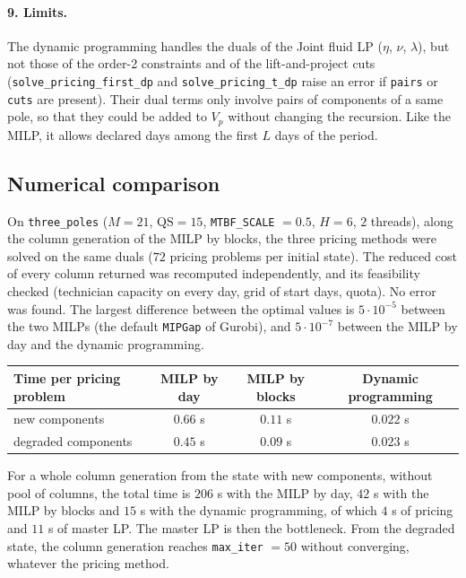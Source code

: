 \documentclass[11pt]{article}
\begin{document}
\paragraph{9. Limits.} The dynamic programming handles the duals of the Joint fluid LP ($\eta$,
$\nu$, $\lambda$), but not those of the order-2 constraints and of the lift-and-project cuts
(\texttt{solve\_pricing\_first\_dp} and \texttt{solve\_pricing\_t\_dp} raise an error if
\texttt{pairs} or \texttt{cuts} are present). Their dual terms only involve pairs of components of a
same pole, so that they could be added to $V_p$ without changing the recursion. Like the MILP, it
allows declared days among the first $L$ days of the period.

\subsection*{Numerical comparison}

On \texttt{three\_poles} ($M = 21$, $\mathrm{QS} = 15$, \texttt{MTBF\_SCALE} $= 0.5$, $H = 6$, $2$
threads), along the column generation of the MILP by blocks, the three pricing methods were solved
on the same duals ($72$ pricing problems per initial state). The reduced cost of every column
returned was recomputed independently, and its feasibility checked (technician capacity on every
day, grid of start days, quota). No error was found. The largest difference between the optimal
values is $5 \cdot 10^{-5}$ between the two MILPs (the default \texttt{MIPGap} of Gurobi), and
$5 \cdot 10^{-7}$ between the MILP by day and the dynamic programming.
\begin{center}
\begin{tabular}{lccc}
  \toprule
  Time per pricing problem & MILP by day & MILP by blocks & Dynamic programming \\
  \midrule
  new components & $0.66$ s & $0.11$ s & $0.022$ s \\
  degraded components & $0.45$ s & $0.09$ s & $0.023$ s \\
  \bottomrule
\end{tabular}
\end{center}
For a whole column generation from the state with new components, without pool of columns, the
total time is $206$ s with the MILP by day, $42$ s with the MILP by blocks and $15$ s with the
dynamic programming, of which $4$ s of pricing and $11$ s of master LP. The master LP is then the
bottleneck. From the degraded state, the column generation reaches \texttt{max\_iter} $= 50$
without converging, whatever the pricing method.
\end{document}

